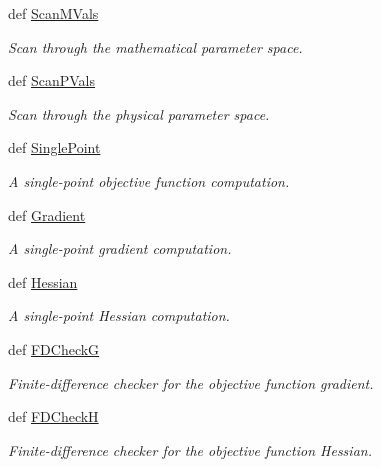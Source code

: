 \begin{DoxyCompactItemize}
def \hyperlink{classforcebalance_1_1optimizer_1_1Optimizer_a43ab8c6bea2b3112468922ab61163f67}{\-Scan\-M\-Vals}
\begin{DoxyCompactList}\small\item\em \-Scan through the mathematical parameter space. \end{DoxyCompactList}\item 
def \hyperlink{classforcebalance_1_1optimizer_1_1Optimizer_a70bff76f2e56d87c8dee8aa92fe56d29}{\-Scan\-P\-Vals}
\begin{DoxyCompactList}\small\item\em \-Scan through the physical parameter space. \end{DoxyCompactList}\item 
def \hyperlink{classforcebalance_1_1optimizer_1_1Optimizer_a1477d2b88faa1d4991418538133abcff}{\-Single\-Point}
\begin{DoxyCompactList}\small\item\em \-A single-\/point objective function computation. \end{DoxyCompactList}\item 
def \hyperlink{classforcebalance_1_1optimizer_1_1Optimizer_ac5adf24cf3ea3976eb67f75b6b89d101}{\-Gradient}
\begin{DoxyCompactList}\small\item\em \-A single-\/point gradient computation. \end{DoxyCompactList}\item 
def \hyperlink{classforcebalance_1_1optimizer_1_1Optimizer_a0c16ad8678a6480e235a45d69fb077d3}{\-Hessian}
\begin{DoxyCompactList}\small\item\em \-A single-\/point \-Hessian computation. \end{DoxyCompactList}\item 
def \hyperlink{classforcebalance_1_1optimizer_1_1Optimizer_aacf96d137fb0e491af7e380c8bd61eb9}{\-F\-D\-Check\-G}
\begin{DoxyCompactList}\small\item\em \-Finite-\/difference checker for the objective function gradient. \end{DoxyCompactList}\item 
def \hyperlink{classforcebalance_1_1optimizer_1_1Optimizer_adb86c1f6580bb088a23563a6103986fe}{\-F\-D\-Check\-H}
\begin{DoxyCompactList}\small\item\em \-Finite-\/difference checker for the objective function \-Hessian. \end{DoxyCompactList}\item 

\end{DoxyCompactItemize}
